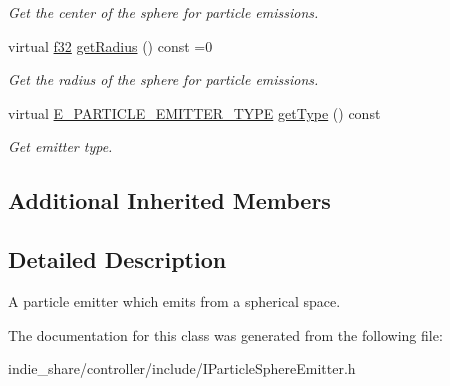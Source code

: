\begin{DoxyCompactItemize}
\begin{DoxyCompactList}\small\item\em Get the center of the sphere for particle emissions. \end{DoxyCompactList}\item 
\mbox{\label{classirr_1_1scene_1_1IParticleSphereEmitter_aae898401589c9152990990800cb573ce}} 
virtual \hyperlink{namespaceirr_a0277be98d67dc26ff93b1a6a1d086b07}{f32} \hyperlink{classirr_1_1scene_1_1IParticleSphereEmitter_aae898401589c9152990990800cb573ce}{get\+Radius} () const =0
\begin{DoxyCompactList}\small\item\em Get the radius of the sphere for particle emissions. \end{DoxyCompactList}\item 
\mbox{\label{classirr_1_1scene_1_1IParticleSphereEmitter_aed807c85d4a31076ffff8f2bc3524124}} 
virtual \hyperlink{namespaceirr_1_1scene_a3e251a881c886884a78adea2e546272b}{E\+\_\+\+P\+A\+R\+T\+I\+C\+L\+E\+\_\+\+E\+M\+I\+T\+T\+E\+R\+\_\+\+T\+Y\+PE} \hyperlink{classirr_1_1scene_1_1IParticleSphereEmitter_aed807c85d4a31076ffff8f2bc3524124}{get\+Type} () const
\begin{DoxyCompactList}\small\item\em Get emitter type. \end{DoxyCompactList}\end{DoxyCompactItemize}
\subsection*{Additional Inherited Members}


\subsection{Detailed Description}
A particle emitter which emits from a spherical space. 

The documentation for this class was generated from the following file\+:\begin{DoxyCompactItemize}
\item 
indie\+\_\+share/controller/include/I\+Particle\+Sphere\+Emitter.\+h\end{DoxyCompactItemize}
